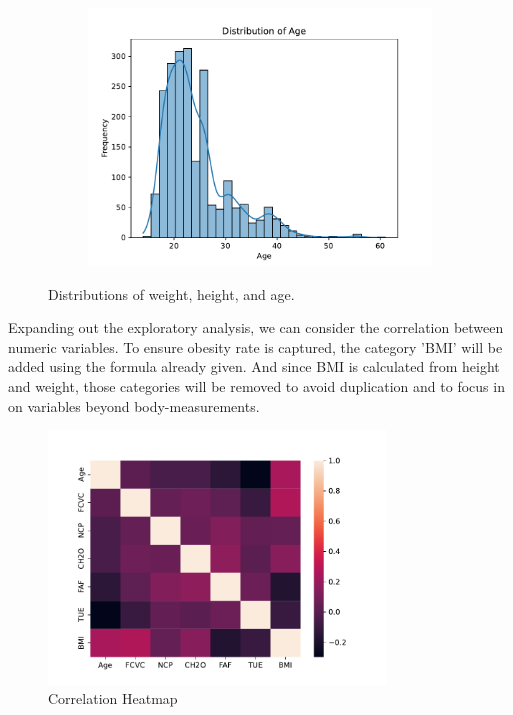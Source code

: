 \begin{figure}
\begin{subfigure}[b]{0.7\textwidth}
    \label{fig:height}
  \end{subfigure}
  \hfill
  \begin{subfigure}[b]{0.7\textwidth}
    \centering
    \includegraphics[width=\textwidth]{age_dist.pdf}
    \label{fig:age}
  \end{subfigure}
  \caption{Distributions of weight, height, and age.}
  \label{fig:distributions}
\end{figure}

Expanding out the exploratory analysis, we can consider the correlation between numeric variables. To ensure obesity rate is captured, the category 'BMI' will be added using the formula already given. And since BMI is calculated from height and weight, those categories will be removed to avoid duplication and to focus in on variables beyond body-measurements.

\begin{figure}
  \centering
  \includegraphics[width=0.8\textwidth]{numeric_correlations.pdf}
  \caption{Correlation Heatmap}
  \label{fig:heatmap}
\end{figure}

